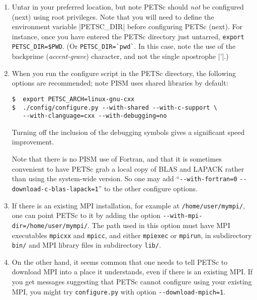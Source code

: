 \documentclass[11pt,final]{amsart}
\newcommand{\und}{\_\!\_}
\begin{document}
\begin{enumerate}
\renewcommand{\labelenumii}{(\roman{enumii})}\begin{enumerate}
\item Untar in your preferred location, but note PETSc should \emph{not} be configured (next) using root privileges. Note that you
  will need to define the environment variable |PETSC_DIR|\index{PETSC\und DIR} before configuring PETSc (next). For instance,
  once you have entered the PETSc directory just untarred, \verb|export PETSC_DIR=$PWD|. (Or \verb|PETSC_DIR=`pwd`|. In this case,
  note the use of the backprime (\emph{accent-grave}) character, and not the single apostrophe |'|.)

\item When you run the configure script in the PETSc directory, the following options are recommended; note PISM uses shared
  libraries by default:\index{PETSC\und ARCH}
\begin{verbatim}
$  export PETSC_ARCH=linux-gnu-cxx
$  ./config/configure.py --with-shared --with-c-support \
   --with-clanguage=cxx --with-debugging=no
\end{verbatim}

Turning off the inclusion of the debugging symbols gives a significant speed improvement.

Note that there is no PISM use of Fortran, and that it is sometimes convenient to have PETSc grab a local copy of BLAS and LAPACK rather than using the system-wide version.  So one may add ``\verb|--with-fortran=0| \verb|--download-c-blas-lapack=1|'' to the other configure options.

\item If there is an existing MPI installation, for example at \verb|/home/user/mympi/|, one can point PETSc to it by adding the option \verb|--with-mpi-dir=/home/user/mympi/|.  The path used in this option must have MPI executables \verb|mpicxx| and \verb|mpicc|, and either \verb|mpiexec| or \verb|mpirun|, in subdirectory \verb|bin/| and MPI library files in subdirectory \verb|lib/|.

\item On the other hand, it seems common that one needs to tell PETSc to download MPI into a place it understands, even if there is an existing MPI.  If you get messages suggesting that PETSc cannot configure using your existing MPI, you might try \verb|configure.py| with option \verb|--download-mpich=1|.


\end{enumerate}
\end{enumerate}
\end{document}

